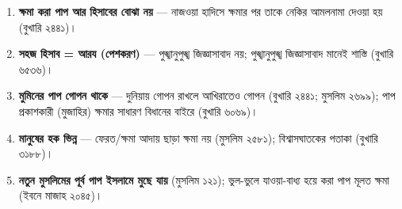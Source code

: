 \begin{enumerate}
\item \textbf{ক্ষমা করা পাপ আর হিসাবের বোঝা নয়} — নাজওয়া হাদিসে ক্ষমার পর তাকে নেকির আমলনামা দেওয়া হয় (বুখারি ২৪৪১)।
\item \textbf{সহজ হিসাব = আরয (পেশকরণ)} — পুঙ্খানুপুঙ্খ জিজ্ঞাসাবাদ নয়; পুঙ্খানুপুঙ্খ জিজ্ঞাসাবাদ মানেই শাস্তি (বুখারি ৬৫৩৬)।
\item \textbf{মুমিনের পাপ গোপন থাকে} — দুনিয়ায় গোপন রাখলে আখিরাতেও গোপন (বুখারি ২৪৪১; মুসলিম ২৬৯৯); পাপ প্রকাশকারী (মুজাহির) ক্ষমার সাধারণ বিধানের বাইরে (বুখারি ৬০৬৯)।
\item \textbf{মানুষের হক ভিন্ন} — ফেরত/ক্ষমা আদায় ছাড়া ক্ষমা নয় (মুসলিম ২৫৮১); বিশ্বাসঘাতকের পতাকা (বুখারি ৩১৮৮)।
\item \textbf{নতুন মুসলিমের পূর্ব পাপ ইসলামে মুছে যায়} (মুসলিম ১২১); ভুল-ভুলে যাওয়া-বাধ্য হয়ে করা পাপ মূলত ক্ষমা (ইবনে মাজাহ ২০৪৫)।
\end{enumerate}


